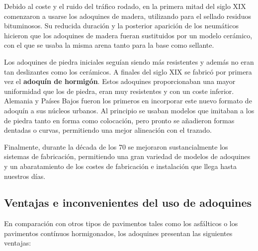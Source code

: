 Debido al coste y el ruido del tráfico rodado, en la primera mitad del siglo XIX comenzaron a usarse los adoquines de madera, utilizando para el sellado residuos bituminosos. Su reducida duración y la posterior aparición de los neumáticos hicieron que los adoquines de madera fueran sustituidos por un modelo cerámico, con el que se usaba la misma arena tanto para la base como sellante.

Los adoquines de piedra iniciales seguían siendo más resistentes y además no eran tan deslizantes como los cerámicos. A finales del siglo XIX se fabricó por primera vez el \textbf{adoquín de hormigón}. Estos adoquines proporcionaban una mayor uniformidad que los de piedra, eran muy resistentes y con un coste inferior. Alemania y Países Bajos fueron los primeros en incorporar este nuevo formato de adoquín a sus núcleos urbanos. Al principio se usaban modelos que imitaban a los de piedra tanto en forma como colocación, pero pronto se añadieron formas dentadas o curvas, permitiendo una mejor alineación con el trazado.

Finalmente, durante la década de los 70 se mejoraron sustancialmente los sistemas de fabricación, permitiendo una gran variedad de modelos de adoquines y un abaratamiento de los costes de fabricación e instalación que llega hasta nuestros días.

\subsection{Ventajas e inconvenientes del uso de adoquines}\label{sec:ventajas}

En comparación con otros tipos de pavimentos tales como los asfálticos o los pavimentos contínuos hormigonados, los adoquines presentan las siguientes ventajas:

